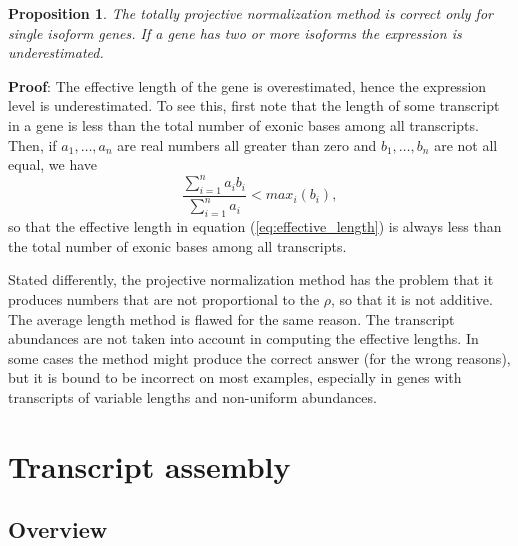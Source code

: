 \documentclass[12pt]{amsart}
\newtheorem{prop}[thm]{Proposition}
\theoremstyle{definition}
\begin{document}
\begin{prop}
The totally projective normalization method is correct only for single isoform
genes. If a gene has two or more isoforms the expression is underestimated.
\end{prop}
{\bf Proof}: The effective length of the gene is overestimated, hence
the expression level is underestimated. To see this, first note that
the length of some transcript in a gene is less than the total number
of exonic bases among all transcripts. Then,  if $a_1,\ldots,a_n$ are
real numbers all greater than zero and $b_1,\ldots,b_n$ are not all equal, we have
\begin{equation}
\frac{\sum_{i=1}^na_ib_i}{\sum_{i=1}^n a_i} < max_{i}(b_i),
\end{equation}
so that the effective length in equation (\ref{eq:effective_length}) is always less than the total
number of exonic bases among all transcripts.

Stated differently, the projective normalization method has the problem that
it produces numbers that are not proportional to the $\rho$, so that
it is not additive. The average length method is flawed for the same reason. The
transcript abundances are not taken into account in computing the
effective lengths. In some cases the method might produce the correct
answer (for the wrong reasons), but it is bound to be incorrect on most examples,
especially in genes with transcripts of variable lengths and
non-uniform abundances.

\section{Transcript assembly}
\label{sec:assembly}
\subsection{Overview}
\end{document}
